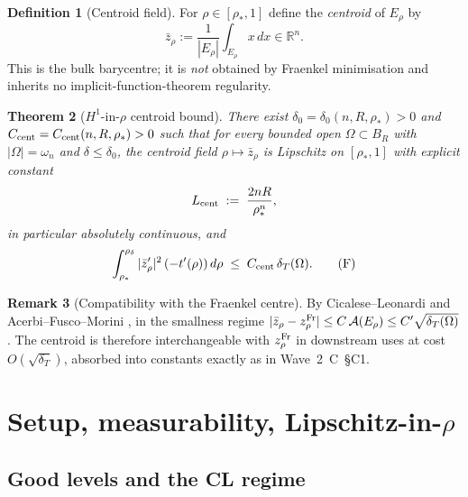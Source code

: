 \documentclass[11pt]{article}
\newtheorem{theorem}{Theorem}[section]
\theoremstyle{definition}
\newtheorem{definition}[theorem]{Definition}
\newtheorem{remark}[theorem]{Remark}
\newcommand{\R}{\mathbb{R}}
\newcommand{\Om}{\Omega}
\newcommand{\rstar}{\rho_{*}}
\newcommand{\zbar}{\bar z_{\rho}}
\begin{document}
\begin{definition}[Centroid field]\label{def:centroid}
For $\rho\in[\rstar,1]$ define the \emph{centroid} of $E_\rho$ by
\begin{equation}\label{eq:centroid-def}
   \zbar:=\frac{1}{|E_\rho|}\int_{E_\rho}x\,dx\in\R^n.
\end{equation}
This is the bulk barycentre; it is \emph{not} obtained by Fraenkel
minimisation and inherits no implicit-function-theorem regularity.
\end{definition}

\begin{theorem}[$H^{1}$-in-$\rho$ centroid bound]\label{thm:F}
There exist $\delta_0=\delta_0(n,R,\rstar)>0$ and
$C_{\rm cent}=C_{\rm cent}(n,R,\rstar)>0$ such that for every bounded
open $\Om\subset B_R$ with $|\Om|=\omega_n$ and $\delta\le\delta_0$,
the centroid field $\rho\mapsto\zbar$ is Lipschitz on $[\rstar,1]$
with explicit constant
\begin{equation}\label{eq:Lcent}
   L_{\rm cent}\;:=\;\frac{2nR}{\rstar^{n}},
\end{equation}
in particular absolutely continuous, and
\begin{equation}\label{eq:F}
   \int_{\rstar}^{\rho_\delta}
     |\bar z_\rho'|^{2}\,(-t'(\rho))\,d\rho
   \;\le\;C_{\rm cent}\,\delta_T(\Om). \tag{F}
\end{equation}
\end{theorem}

\begin{remark}[Compatibility with the Fraenkel centre]\label{rmk:CFr}
By Cicalese--Leonardi \cite[Prop.~2.3]{CL2012} and Acerbi--Fusco--Morini
\cite[Lem.~2.6]{AFM2013}, in the smallness regime
$|\zbar-z^{\rm Fr}_\rho|\le C\,\mathcal A(E_\rho)\le C'\sqrt{\delta_T(\Om)}$.
The centroid is therefore interchangeable with $z^{\rm Fr}_\rho$ in
downstream uses at cost $O(\sqrt{\delta_T})$, absorbed into
constants exactly as in Wave~2~C~§C1.
\end{remark}

\section{Setup, measurability, Lipschitz-in-$\rho$}\label{sec:setup}

\subsection{Good levels and the CL regime}
\end{document}

